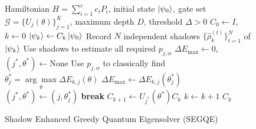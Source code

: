 \begin{figure}[htbp]
    \begin{minipage}{1\linewidth}
        \begin{algorithm}[H]
  \caption{Shadow Enhanced Greedy Quantum Eigensolver (SEGQE)}
  \label{alg:segqe}
  \begin{algorithmic}[1]
    \Require Hamiltonian $H = \sum_{i=1}^r c_i P_i$, initial state $\ket{\psi_0}$,
             gate set $\mathcal{G} = \{U_j(\theta)\}_{j=1}^K$, 
             maximum depth $D$, threshold $\Delta > 0$
    \State $C_0 \gets I$, $k \gets 0$
      \State $\ket{\psi_k} \gets C_k \ket{\psi_0}$
      \State Record $N$ independent shadows $\{\hat{\rho}_k^{(t)}\}_{t=1}^N$ of $\ket{\psi_k}$
      \State Use shadows to estimate all required $p_{j,\alpha}$ 
      \State $\Delta E_{\mathrm{max}} \gets 0$, $(j^*, \theta^*) \gets \text{None}$
        \State Use $p_{j,\alpha}$ to classically find $\theta^*_j=\underset{\theta}{\arg\max} \Delta E_{k,j}(\theta)$
          \State $\Delta E_{\mathrm{max}} \gets \Delta E_{k,j}(\theta^*_j)$
          \State $(j^*, \theta^*) \gets (j, \theta^*_j)$
        \EndIf
      \EndFor
        \State \textbf{break}  %
      \EndIf
      \State $C_{k+1} \gets U_{j^*}(\theta^*) C_k$
      \State $k \gets k + 1$
    \EndWhile
    \State \Return $C_k$%
  \end{algorithmic}
\end{algorithm}
    \end{minipage}

\end{figure}